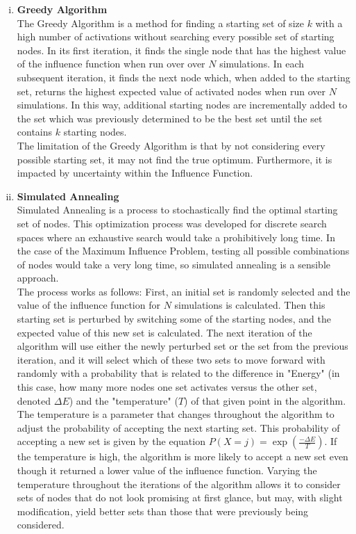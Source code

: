 \documentclass[11pt]{scrartcl} %
\begin{document}
\begin{enumerate}[A)]
\begin{enumerate}[i.]
\par
\item \textbf {Greedy Algorithm}\\
The Greedy Algorithm is a method for finding a starting set of size $k$ with a high number of activations without searching every possible set of starting nodes.  In its first iteration, it finds the single node that has the highest value of the influence function when run over over $N$ simulations.  In each subsequent iteration, it finds the next node which, when added to the starting set, returns the highest expected value of activated nodes when run over $N$ simulations.  In this way, additional starting nodes are incrementally added to the set which was previously determined to be the best set until the set contains $k$ starting nodes.\\ 

The limitation of the Greedy Algorithm is that by not considering every possible starting set, it may not find the true optimum.  Furthermore, it is impacted by uncertainty within the Influence Function. \\

\par
\item \textbf {Simulated Annealing}\\
Simulated Annealing is a process to stochastically find the optimal starting set of nodes.  This optimization process was developed for discrete search spaces where an exhaustive search would take a prohibitively long time.  In the case of the Maximum Influence Problem, testing all possible combinations of nodes would take a very long time, so simulated annealing is a sensible approach.  \\

The process works as follows: First, an initial set is randomly selected and the value of the influence function for $N$ simulations is calculated.  Then this starting set is perturbed by switching some of the starting nodes, and the expected value of this new set is calculated.  The next iteration of the algorithm will use either the newly perturbed set or the set from the previous iteration, and it will select which of these two sets to move forward with randomly with a probability that is related to the difference in "Energy" (in this case, how many more nodes one set activates versus the other set, denoted $\Delta E$) and the "temperature" ($T$) of that given point in the algorithm.  The temperature is a parameter that changes throughout the algorithm to adjust the probability of accepting the next starting set.  This probability of accepting a new set is given by the equation $P(X=j)=\exp({\frac{-\Delta E}{T}})$.  If the temperature is high, the algorithm is more likely to accept a new set even though it returned a lower value of the influence function.  Varying the temperature throughout the iterations of the algorithm allows it to consider sets of nodes that do not look promising at first glance, but may, with slight modification, yield better sets than those that were previously being considered.  \\


\end{enumerate}
\end{enumerate}
\end{document}
